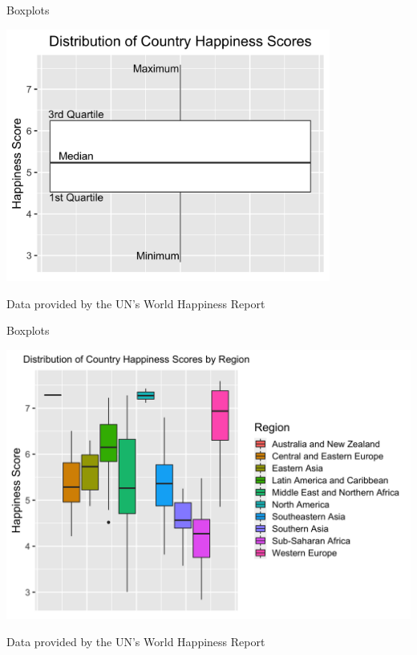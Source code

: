\documentclass{beamer}
\begin{document}
\begin{frame}{Boxplots}
	
	\begin{center}
		\includegraphics[width=0.8\textwidth]{boxplot}
	\end{center}
	\small{Data provided by the UN's World Happiness Report}
\end{frame}

\begin{frame}{Boxplots}
	
	\begin{center}
		\includegraphics[width=\textwidth]{boxplot_region}
	\end{center}
	\small{Data provided by the UN's World Happiness Report}
\end{frame}

\end{document}
